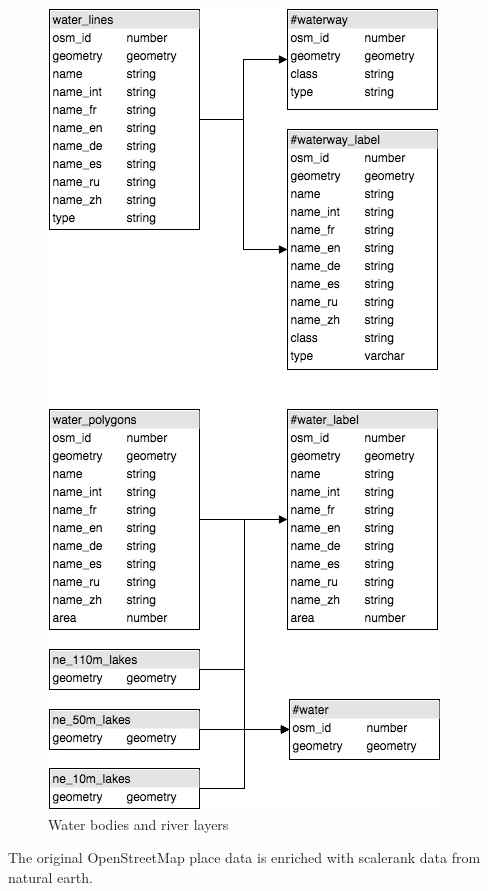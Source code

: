 \begin{figure}[h]
  \includegraphics[scale=0.6]{images/water_layer.png}
  \caption{Water bodies and river layers}
\end{figure}



\newpage
The original OpenStreetMap place data is enriched with scalerank data
from natural earth.

